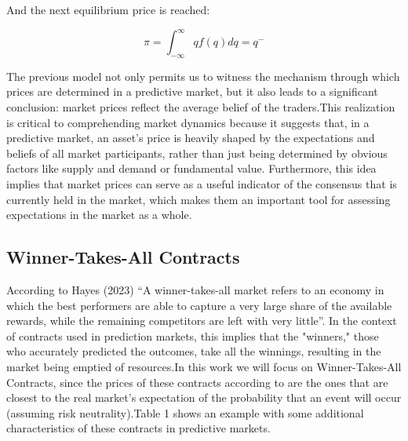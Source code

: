 And the next equilibrium price is reached:

\begin{equation}
    \pi = \int_{-\infty}^{\infty} q f(q) dq = q^-
\end{equation}

The previous model not only permits us to witness the mechanism through which prices are determined in a predictive market, but it also leads to a significant conclusion: market prices reflect the average belief of the traders.This realization is critical to comprehending market dynamics because it suggests that, in a predictive market, an asset's price is heavily shaped by the expectations and beliefs of all market participants, rather than just being determined by obvious factors like supply and demand or fundamental value. Furthermore, this idea implies that market prices can serve as a useful indicator of the consensus that is currently held in the market, which makes them an important tool for assessing expectations in the market as a whole. 

\subsection{Winner-Takes-All Contracts}
\label{subsec:winner_takes_all_contracts}

According to Hayes (2023) “A winner-takes-all market refers to an economy in which the best performers are able to capture a very large share of the available rewards, while the remaining competitors are left with very little”. In the context of contracts used in prediction markets, this implies that the "winners," those who accurately predicted the outcomes, take all the winnings, resulting in the market being emptied of resources.In this work we will focus on Winner-Takes-All Contracts, since the prices of these contracts according to \textcite{Zitzewitz2004} are the ones that are closest to the real market's expectation of the probability that an event will occur (assuming risk neutrality).Table 1 shows an example with some additional characteristics of these contracts in predictive markets.

